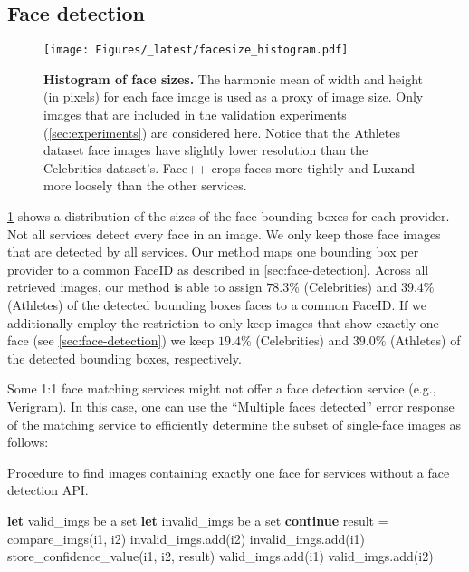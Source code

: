 \documentclass[10pt,twocolumn,letterpaper]{article}
\begin{document}
\begin{appendices}
\FloatBarrier

\section{Face detection}
\label{appendix:service-interrogation}


\begin{figure}[h!]
    \centering
    \texttt{[image: Figures/\_latest/facesize\_histogram.pdf]}
    \caption{{\bf Histogram of face sizes.} The harmonic mean of width and height (in pixels) for each face image is used as a proxy of image size.  Only images that are included in the validation experiments (\cref{sec:experiments}) are considered here. Notice that the Athletes dataset face images have slightly lower resolution than the Celebrities dataset's. Face++ crops faces more tightly and Luxand more loosely than the other services.}
    \label{fig:img-histogram}
\end{figure}


\cref{fig:img-histogram} shows a distribution of the sizes of the face-bounding boxes for each provider. Not all services detect every face in an image. We only keep those face images that are detected by all services. Our method maps one bounding box per provider to a common FaceID as described in \cref{sec:face-detection}. Across all retrieved images, our method is able to assign $78.3\%$ (Celebrities) and $39.4\%$ (Athletes) of the detected bounding boxes faces to a common FaceID. 
If we additionally employ the restriction to only keep images that show exactly one face (see \cref{sec:face-detection}) we keep $19.4\%$ (Celebrities) and $39.0\%$ (Athletes) of the detected bounding boxes, respectively.

Some 1:1 face matching services might not offer a face detection service (e.g., Verigram). In this case, one can use the ``Multiple faces detected'' error response of the matching service to efficiently determine the subset of single-face images as follows:


\begin{algorithm}
\caption{Procedure to find images containing exactly one face for services without a face detection API.}
\begin{algorithmic}[1]
\State \textbf{let} valid\_imgs be a set
\State \textbf{let} invalid\_imgs be a set
        \State \textbf{continue}
    \EndIf
    \State result = compare\_imgs(i1, i2)
            \State invalid\_imgs.add(i2)
        \EndIf
            \State invalid\_imgs.add(i1)
        \EndIf
    \Else
    \State
    store\_confidence\_value(i1, i2, result)
        \State valid\_imgs.add(i1)
        \State valid\_imgs.add(i2)
    \EndIf
\EndFor
\end{algorithmic}
\end{algorithm}


\end{appendices}
\end{document}
